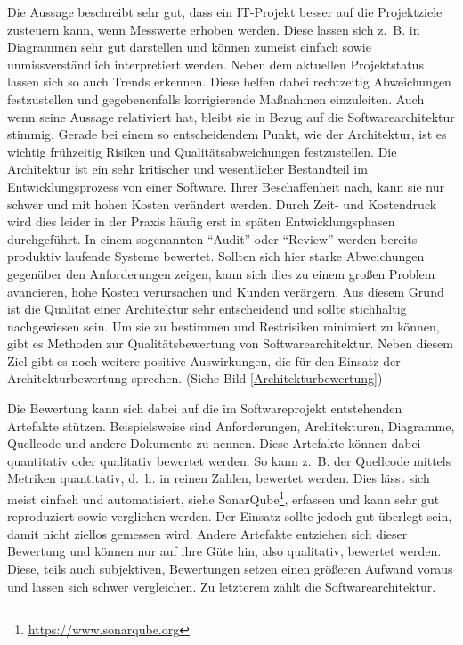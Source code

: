 Die Aussage beschreibt sehr gut, dass ein IT-Projekt besser auf die Projektziele
zusteuern kann, wenn Messwerte erhoben werden. Diese lassen sich z.~B. in Diagrammen sehr gut darstellen und können zumeist einfach sowie unmissverständlich interpretiert werden. Neben dem aktuellen Projektstatus lassen sich so auch Trends erkennen. Diese helfen dabei rechtzeitig Abweichungen festzustellen und gegebenenfalls korrigierende Maßnahmen einzuleiten\cite{Starke2015}. Auch wenn \citeauthor{DeMarco2009} \citeyear{DeMarco2009} seine Aussage relativiert hat\cite{DeMarco2009}, bleibt sie in Bezug auf die Softwarearchitektur stimmig.
Gerade bei einem so entscheidendem Punkt, wie der Architektur, ist es wichtig frühzeitig
Risiken und Qualitätsabweichungen festzustellen. Die Architektur ist ein sehr kritischer
und wesentlicher Bestandteil im Entwicklungsprozess von einer Software. Ihrer Beschaffenheit nach,
kann sie nur schwer und mit hohen Kosten verändert werden.
Durch Zeit- und Kostendruck wird dies leider in der Praxis häufig erst in späten Entwicklungsphasen durchgeführt. 
In einem sogenannten \enquote{Audit} oder \enquote{Review} werden bereits produktiv laufende Systeme bewertet\cite{Starke2015}.
Sollten sich hier starke Abweichungen gegenüber den Anforderungen zeigen, kann sich dies zu einem großen Problem 
avancieren, hohe Kosten verursachen und Kunden verärgern.
Aus diesem Grund ist die Qualität einer Architektur sehr entscheidend und sollte stichhaltig nachgewiesen sein.
Um sie zu bestimmen und Restrisiken minimiert zu können, gibt es Methoden zur Qualitätsbewertung 
von Softwarearchitektur. Neben diesem Ziel gibt es noch weitere positive Auswirkungen, die für den Einsatz der Architekturbewertung sprechen. (Siehe Bild \ref{Architekturbewertung})


Die Bewertung kann sich dabei auf die im Softwareprojekt entstehenden Artefakte stützen. Beispielsweise sind
Anforderungen, Architekturen, Diagramme, Quellcode und andere Dokumente zu nennen. Diese Artefakte können dabei quantitativ 
oder qualitativ bewertet werden. So kann z.~B. der Quellcode mittels Metriken quantitativ, d.~h. in reinen Zahlen, bewertet werden. Dies lässt sich meist einfach und automatisiert, siehe SonarQube\footnote{\url{https://www.sonarqube.org}}, erfassen und kann sehr gut reproduziert sowie verglichen werden. Der Einsatz sollte jedoch gut überlegt sein, damit nicht ziellos gemessen wird.
Andere Artefakte entziehen sich dieser Bewertung und können nur auf ihre Güte hin, also qualitativ, bewertet werden. Diese, teils auch subjektiven, Bewertungen setzen einen größeren Aufwand voraus und lassen sich schwer vergleichen.  
Zu letzterem zählt die Softwarearchitektur. 

